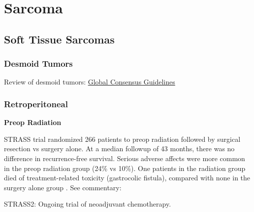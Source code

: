 \documentclass[
]{book}
\begin{document}
\hypertarget{part-sarcoma}{%
\part*{Sarcoma}\label{part-sarcoma}}

\hypertarget{soft-tissue-sarcomas}{%
\chapter{Soft Tissue Sarcomas}\label{soft-tissue-sarcomas}}

\hypertarget{desmoid-tumors}{%
\section{Desmoid Tumors}\label{desmoid-tumors}}

Review of desmoid tumors: \href{https://www.ejcancer.com/article/S0959-8049(19)30832-9/fulltext}{Global Consensus Guidelines}

\hypertarget{retroperitoneal}{%
\section{Retroperitoneal}\label{retroperitoneal}}

\textbf{Preop Radiation}

STRASS trial randomized 266 patients to preop radiation followed by surgical resection vs surgery alone. At a median followup of 43 months, there was no difference in recurrence-free survival. Serious adverse affects were more common in the preop radiation group (24\% vs 10\%). One patients in the radiation group died of treatment-related toxicity (gastrocolic fistula), compared with none in the surgery alone group \citep{bonvalot1366}. See commentary: \citep{cardona1257}

STRASS2: Ongoing trial of neoadjuvant chemotherapy.

  
\end{document}
